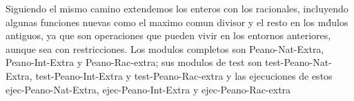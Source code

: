 Siguiendo el mismo camino extendemos los enteros con los racionales, incluyendo algunas funciones nuevas como el maximo comun divisor y el resto en los m\'dulos antiguos, ya que son operaciones que pueden vivir en los entornos anteriores, aunque sea con restricciones. Los modulos completos son Peano-Nat-Extra, Peano-Int-Extra y Peano-Rac-extra; sus modulos de test son test-Peano-Nat-Extra, test-Peano-Int-Extra y test-Peano-Rac-extra y las ejecuciones de estos ejec-Peano-Nat-Extra, ejec-Peano-Int-Extra y ejec-Peano-Rac-extra \par


